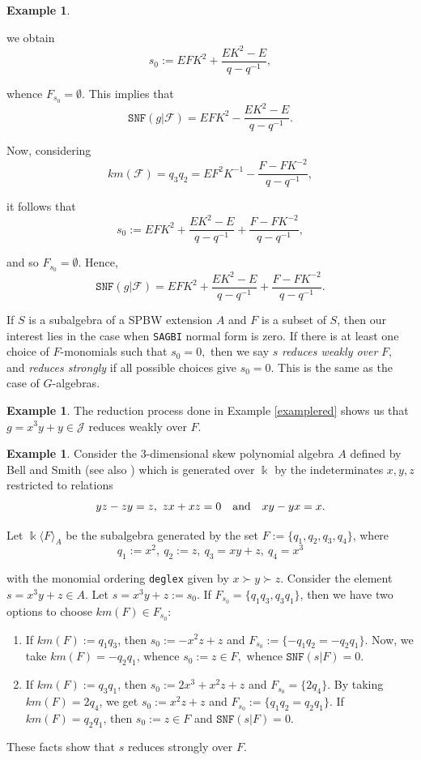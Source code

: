 \documentclass{amsart}
\theoremstyle{definition}
\newtheorem{example}[theorem]{Example}
\theoremstyle{remark}
\numberwithin{equation}{section}
\begin{document}
\begin{example}
\begin{enumerate}
we obtain 
$$
s_0:=E F K^2+\frac{EK^2-E}{q-q^{-1}},
$$

whence $F_{s_0}=\emptyset$. This implies that 
$$
\texttt{SNF}(g |\mathcal{F} )=E F K^2-\frac{EK^2-E}{q-q^{-1}}.
$$ 

Now, considering $$
km(\mathcal{F})=q_3q_2=E F^2 K^{-1}-\frac{F-F K^{-2}}{q-q^{-1}}, $$ 

it follows that 
$$
s_0:=E F K^2+\frac{EK^2-E}{q-q^{-1}}+\frac{F-F K^{-2}}{q-q^{-1}}, 
$$

and so $F_{s_0}=\emptyset$. Hence, 
$$\texttt{SNF}(g |\mathcal{F} )= E F K^2+\frac{EK^2-E}{q-q^{-1}}+\frac{F-F K^{-2}}{q-q^{-1}}.
$$
\end{enumerate}
\end{example}

If $S$ is a subalgebra of a SPBW extension $A$ and $F$ is a subset of $S$, then our interest lies in the case when \texttt{SAGBI} normal form is zero. If there is at least one choice of $F$-monomials such that $s_{0}=0,$ then we say $s$ \textit{reduces weakly over} $F,$ and \textit{reduces strongly} if all possible choices give $s_{0}=0$. This is the same as the case of $G$-algebras.

\begin{example}
The reduction process done in Example \ref{examplered} shows us that $g=x^3y+y\in \mathcal{J}$ reduces weakly over $F.$
\end{example}

\begin{example}\label{examplered2}
Consider the 3-dimensional skew polynomial algebra $A$ defined by Bell and Smith \cite{BellSmith1990} (see also \cite{ReyesSuarez20173dimentional}) which is generated over $\Bbbk$ by the indeterminates $x,y,z$ restricted to relations
$$
yz- zy=z,\ zx+xz=0 \quad {\rm and} \quad xy-yx=x. 
$$ 

Let $\Bbbk\langle F\rangle_{A}$ be the subalgebra generated by the set $F:=\{q_1, q_2, q_3, q_4\}$, where 
$$
q_1:= x^2, \ q_2:= z, \ q_3=xy+z, \ q_4=x^3
$$ 

with the monomial ordering \texttt{deglex} given by $x\succ y\succ z$. Consider the element $s=x^3y+z\in A$. 
Let $s=x^3y+z:=s_0$. If $F_{s_0}=\{q_1q_3,q_3q_1\}$, then we have two options to choose $km(F) \in F_{s_0}$:
\begin{enumerate}
\item [\rm (i)] If $km(F):= q_1q_3$, then $s_0:=-x^2z+z$ and $F_{s_0}:=\{-q_1q_2=-q_2q_1\}.$ Now, we take $km(F)=-q_2q_1$, whence $s_0:=z\in F,$ whence $\texttt{SNF}(s | F)=0$.
\item [\rm (ii)] If $km(F):= q_3q_1$, then $s_0:=2x^3+x^2z+z$ and $F_{s_0}=\{2q_4\}$. By taking $km(F)=2q_4$, we get $s_0:=x^2z+z$ and $F_{s_0}:=\{q_1q_2=q_2q_1\}.$ If $km(F)=q_2q_1$, then $s_0:=z\in F$ and $\texttt{SNF}(s | F)=0.$
\end{enumerate}

These facts show that $s$ reduces strongly over $F$.
\end{example}
\end{document}
